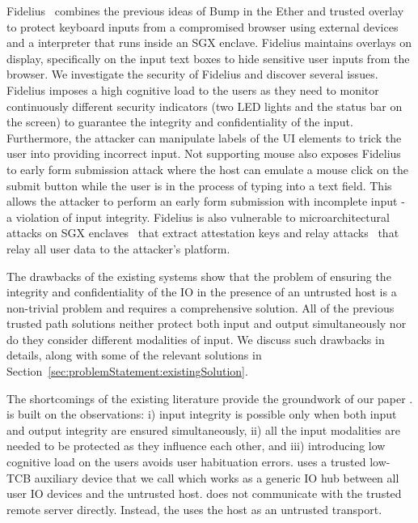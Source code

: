 Fidelius~\cite{Fidelius} combines the previous ideas of Bump in the Ether and trusted overlay to protect keyboard inputs from a compromised browser using external devices and a \js interpreter that runs inside an SGX enclave. Fidelius maintains overlays on display, specifically on the input text boxes to hide sensitive user inputs from the browser. We investigate the security of Fidelius and discover several issues. Fidelius imposes a high cognitive load to the users as they need to monitor continuously different security indicators (two LED lights and the status bar on the screen) to guarantee the integrity and confidentiality of the input. Furthermore, the attacker can manipulate labels of the UI elements to trick the user into providing incorrect input. Not supporting mouse also exposes Fidelius to early form submission attack where the host can emulate a mouse click on the submit button while the user is in the process of typing into a text field. This allows the attacker to perform an early form submission with incomplete input - a violation of input integrity. Fidelius is also vulnerable to microarchitectural attacks on SGX enclaves~\cite{van2018foreshadow} that extract attestation keys and relay attacks~\cite{dhar2018proximitee} that relay all user data to the attacker's platform. 

The drawbacks of the existing systems show that the problem of ensuring the integrity and confidentiality of the IO in the presence of an untrusted host is a non-trivial problem and requires a comprehensive solution. All of the previous trusted path solutions neither protect both input and output simultaneously nor do they consider different modalities of input. We discuss such drawbacks in details, along with some of the relevant solutions in Section~\ref{sec:problemStatement:existingSolution}.

 
 The shortcomings of the existing literature provide the groundwork of our paper \name. %
\name is built on the observations: i) input integrity is possible only when both input and output integrity are ensured simultaneously, ii) all the input modalities are needed to be protected as they influence each other, and iii) introducing low cognitive load on the users avoids user habituation errors. \name uses a trusted low-TCB auxiliary device that we call \device which works as a generic IO hub between all user IO devices and the untrusted host. \device does not communicate with the trusted remote server directly. Instead, the \device uses the host as an untrusted transport.

